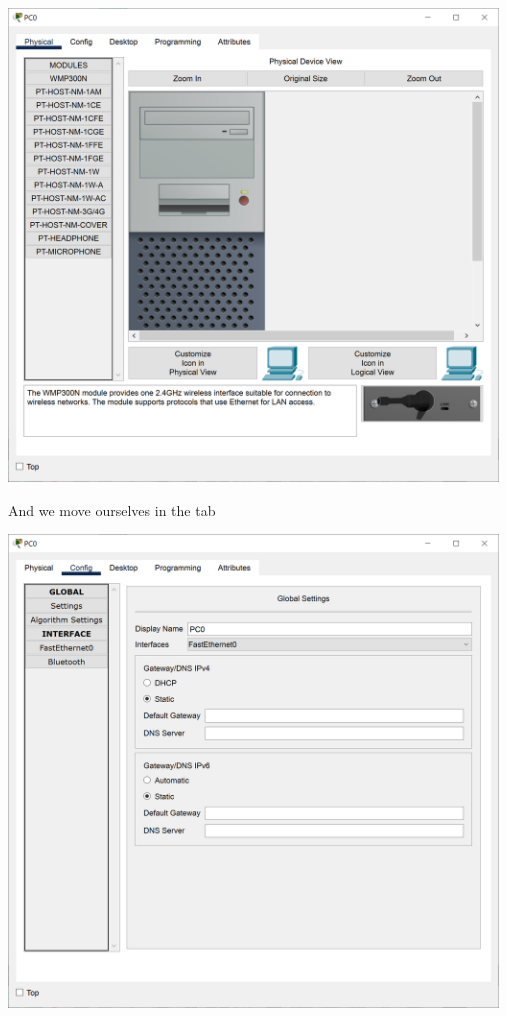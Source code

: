 \documentclass[a4paper,12pt]{book}
\begin{document}
\noindent \includegraphics[width=13cm]{./step-by-step/3.PNG}
\clearpage

\noindent And we move ourselves in the  tab \newline

\noindent \includegraphics[width=13cm]{./step-by-step/4.PNG}
\clearpage
\end{document}
